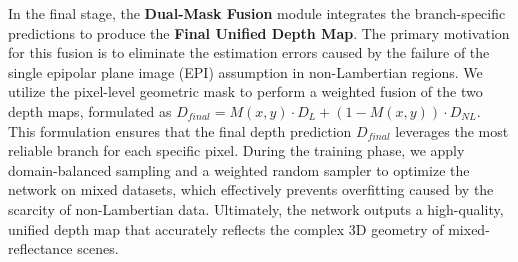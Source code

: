 \documentclass[lettersize,journal]{IEEEtran}
\begin{document}
In the final stage, the \textbf{Dual-Mask Fusion} module integrates the branch-specific predictions to produce the \textbf{Final Unified Depth Map}. The primary motivation for this fusion is to eliminate the estimation errors caused by the failure of the single epipolar plane image (EPI) assumption in non-Lambertian regions. We utilize the pixel-level geometric mask to perform a weighted fusion of the two depth maps, formulated as $D_{final} = M(x,y) \cdot D_L + (1-M(x,y)) \cdot D_{NL}$. This formulation ensures that the final depth prediction $D_{final}$ leverages the most reliable branch for each specific pixel. During the training phase, we apply domain-balanced sampling and a weighted random sampler to optimize the network on mixed datasets, which effectively prevents overfitting caused by the scarcity of non-Lambertian data. Ultimately, the network outputs a high-quality, unified depth map that accurately reflects the complex 3D geometry of mixed-reflectance scenes.
\end{document}
